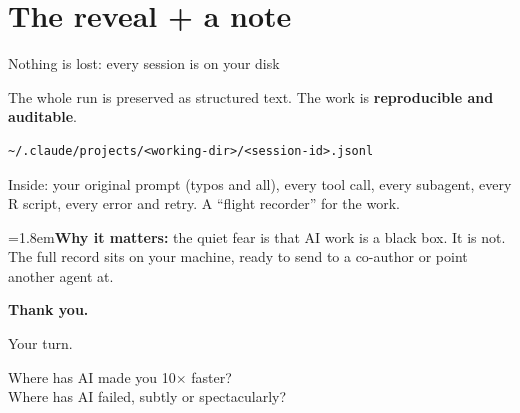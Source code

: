 \documentclass[aspectratio=169, 11pt, t]{beamer}
\newcommand{\mk}[1]{\textcolor{seeblau}{\textbf{#1}}}
\newcommand{\hint}[2]{\par\noindent\hangindent=1.8em\hangafter=1\textcolor{seeblau}{#1}\quad #2\par}
\begin{document}
\section{The reveal + a note}



\begin{frame}[fragile]{Nothing is lost: every session is on your disk}

\small
The whole run is preserved as structured text. The work is \mk{reproducible and auditable}.

\begin{lstlisting}
~/.claude/projects/<working-dir>/<session-id>.jsonl
\end{lstlisting}

\vspace{-0.3em}
\small
Inside: your original prompt (typos and all), every tool call, every subagent, every R script, every error and retry. A \enquote{flight recorder} for the work.

\vfill
\hint{\faLightbulb}{\textbf{Why it matters:} the quiet fear is that AI work is a black box. It is not. The full record sits on your machine, ready to send to a co-author or point another agent at.}

\end{frame}


\begin{frame}[standout]
  \vfill
  {\fontsize{30}{36}\selectfont\textbf{Thank you.}}

  \vspace{1.4em}
  {\large Your turn.}

  \vspace{0.8em}
  \normalsize
  Where has AI made you 10$\times$ faster?\\[0.4em]
  Where has AI failed, subtly or spectacularly?
  \vfill
\end{frame}
\end{document}
